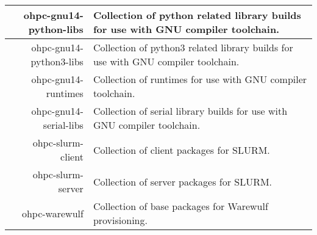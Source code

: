 \begin{tabularx}{\textwidth}{r|X}
\hline
ohpc-gnu14-python-libs & Collection of python related library builds for use with GNU compiler toolchain. \\
\hline
ohpc-gnu14-python3-libs & Collection of python3 related library builds for use with GNU compiler toolchain. \\
\hline
ohpc-gnu14-runtimes & Collection of runtimes for use with GNU compiler toolchain. \\
\hline
ohpc-gnu14-serial-libs & Collection of serial library builds for use with GNU compiler toolchain. \\
\hline
ohpc-slurm-client & Collection of client packages for SLURM. \\
\hline
ohpc-slurm-server & Collection of server packages for SLURM. \\
\hline
ohpc-warewulf & Collection of base packages for Warewulf provisioning. \\
\hline
\bottomrule
\end{tabularx}
